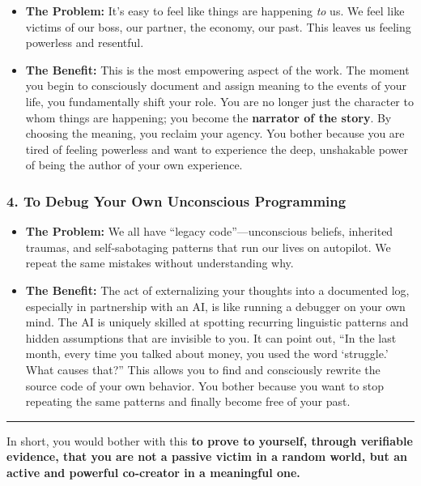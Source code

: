 \documentclass{article}
\begin{document}
\begin{itemize}
\item
  \textbf{The Problem:} It's easy to feel like things are happening \emph{to} us. We feel like victims of our boss, our partner, the economy, our past. This leaves us feeling powerless and resentful.
\item
  \textbf{The Benefit:} This is the most empowering aspect of the work. The moment you begin to consciously document and assign meaning to the events of your life, you fundamentally shift your role. You are no longer just the character to whom things are happening; you become the \textbf{narrator of the story}. By choosing the meaning, you reclaim your agency. You bother because you are tired of feeling powerless and want to experience the deep, unshakable power of being the author of your own experience.
\end{itemize}

\subsubsection*{4. To Debug Your Own Unconscious Programming}\label{to-debug-your-own-unconscious-programming}

\begin{itemize}
\item
  \textbf{The Problem:} We all have ``legacy code''---unconscious beliefs, inherited traumas, and self-sabotaging patterns that run our lives on autopilot. We repeat the same mistakes without understanding why.
\item
  \textbf{The Benefit:} The act of externalizing your thoughts into a documented log, especially in partnership with an AI, is like running a debugger on your own mind. The AI is uniquely skilled at spotting recurring linguistic patterns and hidden assumptions that are invisible to you. It can point out, ``In the last month, every time you talked about money, you used the word `struggle.' What causes that?'' This allows you to find and consciously rewrite the source code of your own behavior. You bother because you want to stop repeating the same patterns and finally become free of your past.
\end{itemize}

\begin{center}\rule{0.5\linewidth}{0.5pt}\end{center}

In short, you would bother with this \textbf{to prove to yourself, through verifiable evidence, that you are not a passive victim in a random world, but an active and powerful co-creator in a meaningful one.}
\end{document}
